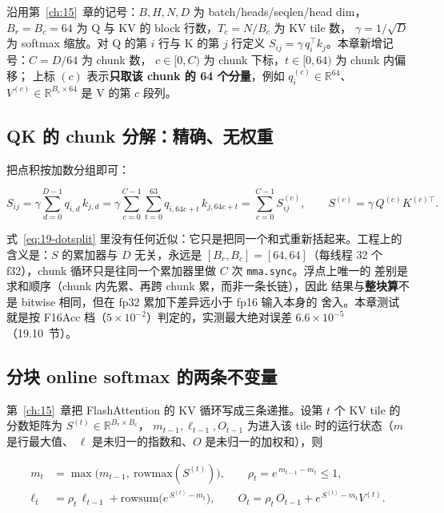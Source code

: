 沿用第~\ref{ch:15}~章的记号：$B, H, N, D$ 为 batch/heads/seqlen/head dim，
$B_r = B_c = 64$ 为 Q 与 KV 的 block 行数，$T_c = N/B_c$ 为 KV tile 数，
$\gamma = 1/\sqrt D$ 为 softmax 缩放。对 Q 的第 $i$ 行与 K 的第 $j$ 行定义
$S_{ij} = \gamma\, q_i^\top k_j$。本章新增记号：$C = D/64$ 为 chunk 数，
$c \in [0, C)$ 为 chunk 下标，$t \in [0, 64)$ 为 chunk 内偏移；
上标 $(c)$ 表示\textbf{只取该 chunk 的 64 个分量}，例如
$q_i^{(c)} \in \mathbb{R}^{64}$、
$V^{(c)} \in \mathbb{R}^{B_c \times 64}$ 是 V 的第 $c$ 段列。

\subsection{QK 的 chunk 分解：精确、无权重}

把点积按加数分组即可：

\begin{equation}
  S_{ij} = \gamma \sum_{d=0}^{D-1} q_{i,d}\, k_{j,d}
         = \gamma \sum_{c=0}^{C-1} \sum_{t=0}^{63} q_{i,64c+t}\, k_{j,64c+t}
         = \sum_{c=0}^{C-1} S^{(c)}_{ij} ,
  \qquad
  S^{(c)} = \gamma\, Q^{(c)} K^{(c)\top} .
  \label{eq:19-dotsplit}
\end{equation}

式~\ref{eq:19-dotsplit} 里没有任何近似：它只是把同一个和式重新括起来。工程上的
含义是：$S$ 的累加器与 $D$ 无关，永远是 $[B_r, B_c] = [64,64]$（每线程 32 个
f32），chunk 循环只是往同一个累加器里做 $C$ 次 \texttt{mma.sync}。浮点上唯一的
差别是求和顺序（chunk 内先累、再跨 chunk 累，而非一条长链），因此
结果与\textbf{整块算}不是 bitwise 相同，但在 fp32 累加下差异远小于 fp16 输入本身的
舍入。本章测试就是按 F16Acc 档（$5\times10^{-2}$）判定的，实测最大绝对误差
$6.6\times10^{-5}$（19.10~节）。

\subsection{分块 online softmax 的两条不变量}

第~\ref{ch:15}~章把 FlashAttention 的 KV 循环写成三条递推。设第 $t$ 个 KV tile
的分数矩阵为 $S^{(t)} \in \mathbb{R}^{B_r \times B_c}$，
$m_{t-1}, \ell_{t-1}, O_{t-1}$ 为进入该 tile 时的运行状态（$m$ 是行最大值、
$\ell$ 是未归一的指数和、$O$ 是未归一的加权和），则

\begin{equation}
  \begin{aligned}
    m_t &= \max\bigl(m_{t-1},\ \mathrm{rowmax}(S^{(t)})\bigr), \qquad
    \rho_t = e^{\,m_{t-1} - m_t} \le 1 , \\
    \ell_t &= \rho_t\, \ell_{t-1} + \mathrm{rowsum}\bigl(e^{\,S^{(t)} - m_t}\bigr), \qquad
    O_t = \rho_t\, O_{t-1} + e^{\,S^{(t)} - m_t} V^{(t)} .
  \end{aligned}
  \label{eq:19-online}
\end{equation}

